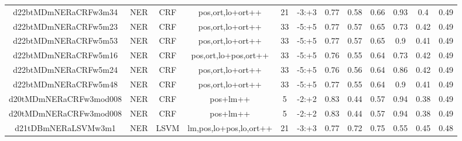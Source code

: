 \documentclass[a4paper]{article}
\begin{document}
\begin{landscape}
\begin{center}
\begin{tabular}{ |c|c|c|c|c|c|c|c|c|c|c|c|}
 
 	
 	\small{ d22btMDmNERaCRFw3m34 } & \small{ NER} & \small{  CRF }  & pos,ort,lo+ort++  &  21 &  \small{  -3:+3 }  &  0.77 & 0.58 & 0.66  &  0.93 & 0.4 & 0.49 \\
 	

 
 	
 	\small{ d22btMDmNERaCRFw5m23 } & \small{ NER} & \small{  CRF }  & pos,ort,lo+ort++  &  33 &  \small{  -5:+5 }  &  0.77 & 0.57 & 0.65  &  0.73 & 0.42 & 0.49 \\
 	

 
 	
 	\small{ d22btMDmNERaCRFw5m53 } & \small{ NER} & \small{  CRF }  & pos,ort,lo+ort++  &  33 &  \small{  -5:+5 }  &  0.77 & 0.57 & 0.65  &  0.9 & 0.41 & 0.49 \\
 	

 
 	
 	\small{ d22btMDmNERaCRFw5m16 } & \small{ NER} & \small{  CRF }  & pos,ort,lo+pos,ort++  &  33 &  \small{  -5:+5 }  &  0.76 & 0.55 & 0.64  &  0.73 & 0.42 & 0.49 \\
 	

 
 	
 	\small{ d22btMDmNERaCRFw5m24 } & \small{ NER} & \small{  CRF }  & pos,ort,lo+ort++  &  33 &  \small{  -5:+5 }  &  0.76 & 0.56 & 0.64  &  0.86 & 0.42 & 0.49 \\
 	

 
 	
 	\small{ d22btMDmNERaCRFw5m48 } & \small{ NER} & \small{  CRF }  & pos,ort,lo+ort++  &  33 &  \small{  -5:+5 }  &  0.77 & 0.55 & 0.64  &  0.9 & 0.41 & 0.49 \\
 	

 
 	
 	\small{ d20tMDmNERaCRFw3mod008 } & \small{ NER} & \small{  CRF }  & pos+lm++  &  5 &  \small{  -2:+2 }  &  0.83 & 0.44 & 0.57  &  0.94 & 0.38 & 0.49 \\
 	

 
 	
 	\small{ d20tMDmNERaCRFw3mod008 } & \small{ NER} & \small{  CRF }  & pos+lm++  &  5 &  \small{  -2:+2 }  &  0.83 & 0.44 & 0.57  &  0.94 & 0.38 & 0.49 \\
 	

 
 	
 	\small{ d21tDBmNERaLSVMw3m1 } & \small{ NER} & \small{  LSVM }  & lm,pos,lo+pos,lo,ort++  &  21 &  \small{  -3:+3 }  &  0.77 & 0.72 & 0.75  &  0.55 & 0.45 & 0.48 \\
 	


\end{tabular}
\end{center}
\end{landscape}
\end{document}
